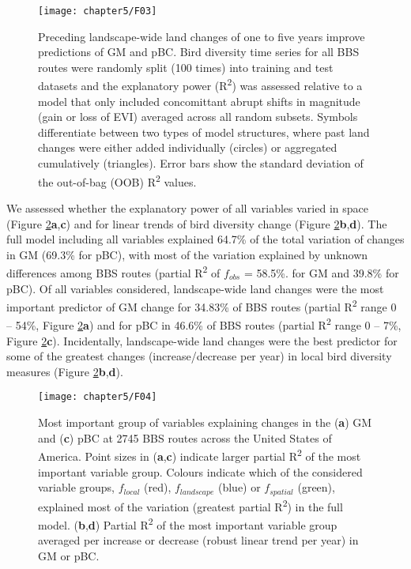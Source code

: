 \begin{figure}[htb]
\centering
\texttt{[image: chapter5/F03]}
\caption{Preceding landscape-wide land changes of one to five years improve predictions of GM and pBC. Bird diversity time series for all BBS routes were randomly split (100 times) into training and test datasets and the explanatory power (R\textsuperscript{2}) was assessed relative to a model that only included concomittant abrupt shifts in magnitude (gain or loss of EVI) averaged across all random subsets. Symbols differentiate between two types of model structures, where past land changes were either added individually (circles) or aggregated cumulatively (triangles). Error bars show the standard deviation of the out-of-bag (OOB) R\textsuperscript{2} values. }
\label{F05_03}
\end{figure}

We assessed whether the explanatory power of all variables varied in space (Figure \ref{F05_04}\textbf{a},\textbf{c}) and for linear trends of bird diversity change (Figure \ref{F05_04}\textbf{b},\textbf{d}). The full model including all variables explained 64.7\% of the total variation of changes in GM (69.3\% for pBC), with most of the variation explained by unknown differences among BBS routes (partial R\textsuperscript{2} of $f_{obs}$ = 58.5\%. for GM and 39.8\% for pBC). Of all variables considered, landscape-wide land changes were the most important predictor of GM change for 34.83\% of BBS routes (partial R\textsuperscript{2} range 0 – 54\%, Figure \ref{F05_04}\textbf{a}) and for pBC in 46.6\% of BBS routes (partial R\textsuperscript{2} range 0 – 7\%, Figure \ref{F05_04}\textbf{c}). Incidentally, landscape-wide land changes were the best predictor for some of the greatest changes (increase/decrease per year) in local bird diversity measures (Figure \ref{F05_04}\textbf{b},\textbf{d}).

\begin{figure}[htb]
\centering
\texttt{[image: chapter5/F04]}
\caption{Most important group of variables explaining changes in the (\textbf{a}) GM and (\textbf{c}) pBC at 2745 BBS routes across the United States of America. Point sizes in (\textbf{a},\textbf{c}) indicate larger partial R\textsuperscript{2} of the most important variable group. Colours indicate which of the considered variable groups, $f_{local}$ (red), $f_{landscape}$ (blue) or $f_{spatial}$ (green), explained most of the variation (greatest partial R\textsuperscript{2}) in the full model. (\textbf{b},\textbf{d}) Partial R\textsuperscript{2} of the most important variable group averaged per increase or decrease (robust linear trend per year) in GM or pBC.  }
\label{F05_04}
\end{figure}

